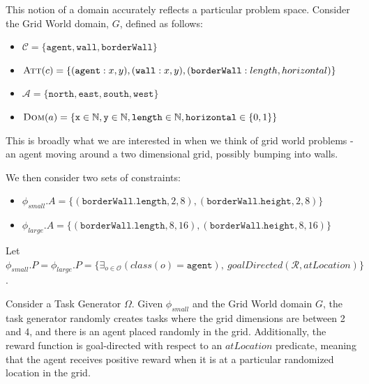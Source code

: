 \documentclass[11pt]{article}
\begin{document}
This notion of a domain accurately reflects a particular problem space. Consider the Grid World domain, $G$, defined as follows:
\begin{itemize}
\item $\mathcal{C} = \{\texttt{agent}, \texttt{wall}, \texttt{borderWall}\}$
\item $\textsc{Att}(c) = \{(\texttt{agent} : x, y), (\texttt{wall} : x, y), (\texttt{borderWall} : length, horizontal)\}$
\item $\mathcal{A} = \{\texttt{north}, \texttt{east}, \texttt{south}, \texttt{west}\}$
\item $\textsc{Dom}(a) = \{\texttt{x} \in \mathbb{N}, \texttt{y} \in \mathbb{N},  \texttt{length} \in \mathbb{N}, \texttt{horizontal} \in \{0,1\}\}$
\end{itemize}

This is broadly what we are interested in when we think of grid world problems - an agent moving around a two dimensional grid, possibly bumping into walls.

We then consider two sets of constraints:
\begin{itemize}
\item $\phi_{small}.A = \{ (\texttt{borderWall.length}, 2, 8), (\texttt{borderWall.height}, 2, 8) \}$
\item $\phi_{large}.A = \{ (\texttt{borderWall.length}, 8, 16), (\texttt{borderWall.height}, 8, 16) \}$
\end{itemize}

Let $\phi_{small}.P = \phi_{large}.P = \{\exists_{o \in \mathcal{O}} \left(class(o) = \texttt{agent}\right),\ goalDirected(\mathcal{R}, atLocation)\}$.

Consider a Task Generator $\Omega$. Given $\phi_{small}$ and the Grid World domain $G$, the task generator randomly creates tasks where the grid dimensions are between 2 and 4, and there is an agent placed randomly in the grid. Additionally, the reward function is goal-directed with respect to an $atLocation$ predicate, meaning that the agent receives positive reward when it is at a particular randomized location in the grid.
\end{document}
